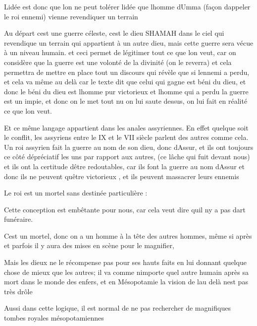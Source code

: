 \documentclass{article}
\begin{document}
L{\textquotesingle}idée est donc que l{\textquotesingle}on ne peut
tolérer l{\textquotesingle}idée que l{\textquotesingle}homme
d{\textquotesingle}Umma (façon d{\textquotesingle}appeler le roi
ennemi) vienne revendiquer un terrain 

Au départ c{\textquotesingle}est une guerre céleste,
c{\textquotesingle}est le dieu SHAMAH dans le ciel qui revendique un
terrain qui appartient à un autre dieu, mais cette guerre sera vécue à
un niveau humain. et ceci permet de légitimer tout ce que
l{\textquotesingle}on veut, car on considère que la guerre est une
volonté de la divinité (on le reverra) et cela permettra de mettre en
place tout un discours qui révèle que si l{\textquotesingle}ennemi a
perdu, et cela va même au delà car le texte dit que celui qui gagne est
béni du dieu, et donc le béni du dieu est l{\textquotesingle}homme pur
victorieux et l{\textquotesingle}homme qui a perdu la guerre est un
impie, et donc on le met tout nu on lui saute dessus, on lui fait en
réalité ce que l{\textquotesingle}on veut. 

Et ce même langage appartient dans les anales assyriennes. En effet
quelque soit le conflit, les assyriens entre le IX et le VII siècle
parlent des autres comme cela. Un roi assyrien fait la guerre au nom de
son dieu, donc d{\textquotesingle}Assur, et ils ont toujours ce côté
dépréciatif les uns par rapport aux autres, (ce lâche qui fuit devant
nous) et ils ont la certitude d{\textquotesingle}être redoutables, car
ils font la guerre au nom d{\textquotesingle}Assur et donc ils ne
peuvent qu{\textquotesingle}être victorieux , et ils peuvent massacrer
leurs ennemis

Le roi est un mortel sans destinée particulière : 

Cette conception est embêtante pour nous, car cela veut dire
qu{\textquotesingle}il n{\textquotesingle}y a pas
d{\textquotesingle}art funéraire.

C{\textquotesingle}est un mortel, donc on a un homme à la tête des
autres hommes, même si après et parfois il y aura des mises en scène
pour le magnifier,  

Mais les dieux ne le récompense pas pour ses hauts faits en lui donnant
quelque chose de mieux que les autres; il va comme
n{\textquotesingle}importe quel autre humain après sa mort dans le
monde des enfers, et en Mésopotamie la vision de l{\textquotesingle}au
delà n{\textquotesingle}est pas très drôle

Aussi dans cette logique, il est normal de ne pas rechercher de
magnifiques tombes royales mésopotamiennes
\end{document}
